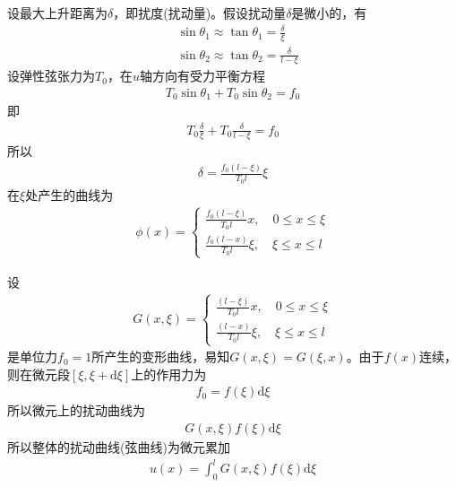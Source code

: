         设最大上升距离为$\delta$，即扰度(扰动量)。假设扰动量$\delta$是微小的，有
        \begin{align*}
        &\sin \theta_1 \approx \tan \theta _1 = \frac{\delta }{\xi} \\
        &\sin \theta_2 \approx \tan \theta _2 = \frac{\delta }{l - \xi}
        \end{align*}
        设弹性弦张力为$T_0$，在$u$轴方向有受力平衡方程
        \begin{align*}
        	T_0 \sin\theta_1 + T_0\sin\theta_2 = f_0
        \end{align*}
        即
        \begin{align*}
        	T_0\frac{\delta}{\xi} + T_0 \frac{\delta}{l - \xi}  =f_0
        \end{align*}
        所以
        \begin{align*}
        	\delta = \frac{f_0 (l - \xi)}{T_0 l}\xi
        \end{align*}
        在$\xi$处产生的曲线为
        \begin{align*}
	        \phi (x) =
	        \left\{
	        	\begin{aligned}
		        	\frac{f_0 (l - \xi)}{T_0 l} x,\quad 0 \leqslant x \leqslant \xi\\
		        	\frac{f_0 (l - x)}{T_0 l} \xi,\quad \xi \leqslant x \leqslant l
	        	\end{aligned}
	        \right.
        \end{align*}
        \par
        设
        \begin{align*}
	        G(x,\xi) =
	        \left\{
	        	\begin{aligned}
		        	\frac{(l - \xi)}{T_0 l} x,\quad 0 \leqslant x \leqslant \xi\\
			        \frac{(l - x)}{T_0 l} \xi,\quad \xi \leqslant x \leqslant l
	        	\end{aligned}
	        \right.
        \end{align*}
        是单位力$f_0 = 1$所产生的变形曲线，易知$G(x,\xi) = G(\xi,x)$。由于$f(x)$连续，则在微元段$[\xi,\xi+\mathrm{d} \xi]$上的作用力为
        \begin{align*}
        	f_0 = f(\xi) \mathrm{d} \xi
        \end{align*}
        所以微元上的扰动曲线为
        \begin{align*}
        	G(x,\xi) f(\xi)\mathrm{d} \xi
        \end{align*}
        所以整体的扰动曲线(弦曲线)为微元累加
        \begin{align}
        	\label{弦振动积分方程}
        	u(x) = \int_0^l G(x,\xi) f(\xi)\mathrm{d} \xi
        \end{align}

